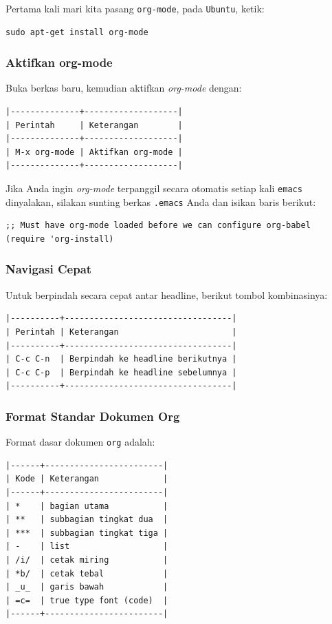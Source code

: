 \documentclass{article}
\begin{document}
Pertama kali mari kita pasang \verb=org-mode=, pada \verb=Ubuntu=, ketik:

\begin{verbatim}
sudo apt-get install org-mode
\end{verbatim}

\subsubsection{Aktifkan org-mode}

Buka berkas baru, kemudian aktifkan \emph{org-mode} dengan:

\begin{verbatim}
|--------------+-------------------|
| Perintah     | Keterangan        |
|--------------+-------------------|
| M-x org-mode | Aktifkan org-mode |
|--------------+-------------------|
\end{verbatim}

Jika Anda ingin \emph{org-mode} terpanggil secara otomatis setiap kali
\verb=emacs= dinyalakan, silakan sunting berkas \verb=.emacs= Anda
dan isikan baris berikut:

\begin{verbatim}
;; Must have org-mode loaded before we can configure org-babel
(require 'org-install)
\end{verbatim}

\subsubsection{Navigasi Cepat}
Untuk berpindah secara cepat antar headline, berikut tombol kombinasinya:

\begin{verbatim}
|----------+----------------------------------|
| Perintah | Keterangan                       |
|----------+----------------------------------|
| C-c C-n  | Berpindah ke headline berikutnya |
| C-c C-p  | Berpindah ke headline sebelumnya |
|----------+----------------------------------|
\end{verbatim}

\subsubsection{Format Standar Dokumen Org}

Format dasar dokumen \verb=org= adalah:

\begin{verbatim}
|------+------------------------|
| Kode | Keterangan             |
|------+------------------------|
| *    | bagian utama           |
| **   | subbagian tingkat dua  |
| ***  | subbagian tingkat tiga |
| -    | list                   |
| /i/  | cetak miring           |
| *b/  | cetak tebal            |
| _u_  | garis bawah            |
| =c=  | true type font (code)  |
|------+------------------------|
\end{verbatim}
\end{document}
